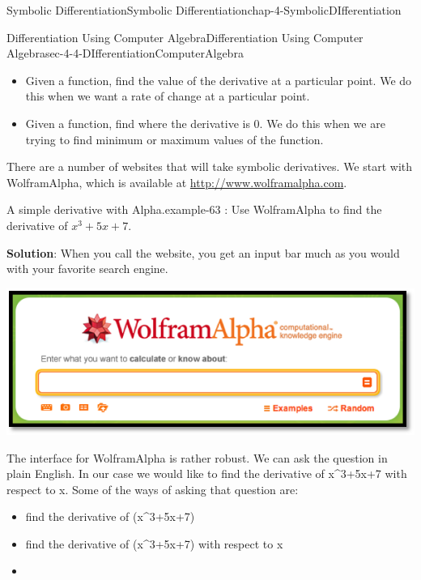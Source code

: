 \documentclass[oneside,10pt,]{book}
\newcommand{\terminology}[1]{\textbf{#1}}
\numberwithin{equation}{section}
\begin{document}
\begin{chapterptx}{Symbolic Differentiation}{}{Symbolic Differentiation}{}{}{chap-4-SymbolicDIfferentiation}
\begin{sectionptx}{Differentiation Using Computer Algebra}{}{Differentiation Using Computer Algebra}{}{}{sec-4-4-DIfferentiationComputerAlgebra}
\begin{itemize}[label=\textbullet]
\item{}\hypertarget{p-1699}{}%
Given a function, find the value of the derivative at a particular point.  We do this when we want a rate of change at a particular point.%
\item{}\hypertarget{p-1700}{}%
Given a function, find where the derivative is 0.  We do this when we are trying to find minimum or maximum values of the function.%
\end{itemize}
\hypertarget{p-1701}{}%
There are a number of websites that will take symbolic derivatives.  We start with Wolfram\textbar{}Alpha, which is available at \href{http://www.wolframalpha.com}{http:\slash{}\slash{}www.wolframalpha.com}.%
\begin{example}{A simple derivative with Alpha.}{example-63}%
\hypertarget{p-1702}{}%
: Use Wolfram\textbar{}Alpha to find the derivative of \(x^3+5x+7\).%
\par
\hypertarget{p-1703}{}%
\terminology{Solution}:  When you call the website, you get an input bar much as you would with your favorite search engine.%
\begin{sidebyside}{1}{0.15}{0.15}{0}%
\begin{sbspanel}{0.7}%
\includegraphics[width=1\linewidth]{images/sec4-4-1.png}
\end{sbspanel}%
\end{sidebyside}%
\par
\hypertarget{p-1704}{}%
The interface for Wolfram\textbar{}Alpha is rather robust.  We can ask the question in plain English.  In our case we would like to find the derivative of x\textasciicircum{}3+5x+7 with respect to x.  Some of the ways of asking that question are:%
\leavevmode%
\begin{itemize}[label=\textbullet]
\item{}\hypertarget{p-1705}{}%
find the derivative of (x\textasciicircum{}3+5x+7)%
\item{}\hypertarget{p-1706}{}%
find the derivative of (x\textasciicircum{}3+5x+7) with respect to x%
\item{}\hypertarget{p-1707}{}%

\end{itemize}
\end{example}
\end{sectionptx}
\end{chapterptx}
\end{document}
